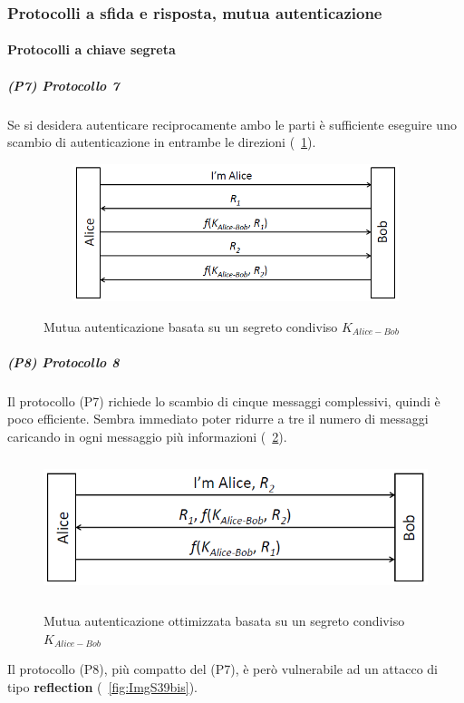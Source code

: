 \subsubsection{Protocolli a sfida e risposta, mutua autenticazione} \label{par:aut_prot_mut_aut}
\paragraph{Protocolli a chiave segreta}
\subparagraph{(P7) Protocollo 7}
Se si desidera autenticare reciprocamente ambo le parti è sufficiente eseguire uno scambio di autenticazione in
entrambe le direzioni (\figurename~\ref{fig:ImgS35bis}).
\begin{figure}[htbp]
	\centering%
	\subfigure%
	{\includegraphics[height=4cm, width=12cm, keepaspectratio]{Immagini/autenticazione/ImgS35bis.png}}
	\caption{Mutua autenticazione basata su un segreto condiviso $K_{Alice-Bob}$}\label{fig:ImgS35bis} 	
\end{figure}
\subparagraph{(P8) Protocollo 8}
Il protocollo (P7) richiede lo scambio di cinque messaggi complessivi, quindi è poco efficiente. Sembra immediato poter ridurre a tre il numero di messaggi caricando in ogni messaggio più informazioni (\figurename~\ref{fig:ImgS36bis}).
\begin{figure}[htbp]
	\centering%
	\subfigure%
	{\includegraphics[height=4cm, width=12cm, keepaspectratio]{Immagini/autenticazione/ImgS36bis.png}}
	\caption{Mutua autenticazione ottimizzata basata su un segreto condiviso $K_{Alice-Bob}$}\label{fig:ImgS36bis} 	
\end{figure}
Il protocollo (P8), più compatto del (P7), è però vulnerabile ad un attacco di tipo \textbf{reflection} (\figurename~\ref{fig:ImgS39bis}). \\
